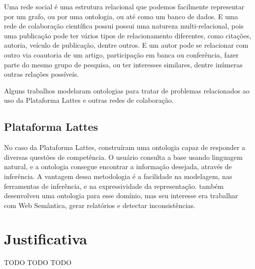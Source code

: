 Uma rede social é uma estrutura relacional que podemos facilmente representar por um grafo, ou por uma ontologia, ou até como um banco de dados. E uma rede de colaboração científica possui possui uma natureza multi-relacional,
pois uma publicação pode ter vários tipos de relacionamento diferentes, como citações, autoria, veículo de publicação, dentre outros. E um autor pode se relacionar com outro via coautoria de um artigo, participação em banca ou conferência, fazer parte do mesmo grupo de pesquisa, ou ter interesses similares, dentre inúmeras outras relações possíveis.

Alguns trabalhos modelaram ontologias para tratar de problemas relacionados ao uso da Plataforma Lattes e outras redes de colaboração.


\subsection{Plataforma Lattes}
\label{ssec:lattes}

No caso da Plataforma Lattes, \citet{Anaue2009} construíram uma ontologia capaz de responder a diversas questões de competência. O usuário consulta a base usando linguagem natural, e a ontologia consegue encontrar a informação desejada, através de inferência. A vantagem dessa metodologia é a facilidade na modelagem, nas ferramentas de inferência, e na
expressividade da representação. \citet{Galego2013} também desenvolveu uma ontologia para esse domínio, mas seu interesse era trabalhar com Web Semântica, gerar relatórios e detectar inconsistências.


\section{Justificativa}
\label{sec:justificativa}


TODO TODO TODO
